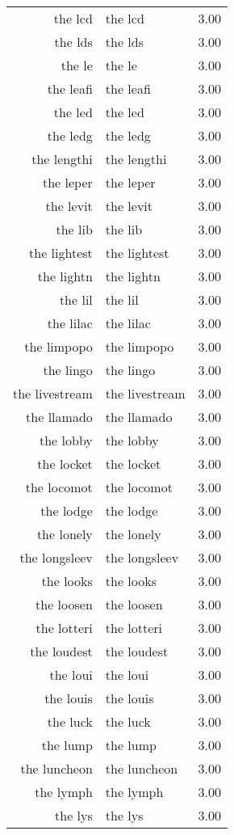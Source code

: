 \begin{table}[ht]
\begin{tabular}{rlr}
  the lcd & the lcd & 3.00 \\ 
  the lds & the lds & 3.00 \\ 
  the le & the le & 3.00 \\ 
  the leafi & the leafi & 3.00 \\ 
  the led & the led & 3.00 \\ 
  the ledg & the ledg & 3.00 \\ 
  the lengthi & the lengthi & 3.00 \\ 
  the leper & the leper & 3.00 \\ 
  the levit & the levit & 3.00 \\ 
  the lib & the lib & 3.00 \\ 
  the lightest & the lightest & 3.00 \\ 
  the lightn & the lightn & 3.00 \\ 
  the lil & the lil & 3.00 \\ 
  the lilac & the lilac & 3.00 \\ 
  the limpopo & the limpopo & 3.00 \\ 
  the lingo & the lingo & 3.00 \\ 
  the livestream & the livestream & 3.00 \\ 
  the llamado & the llamado & 3.00 \\ 
  the lobby & the lobby & 3.00 \\ 
  the locket & the locket & 3.00 \\ 
  the locomot & the locomot & 3.00 \\ 
  the lodge & the lodge & 3.00 \\ 
  the lonely & the lonely & 3.00 \\ 
  the longsleev & the longsleev & 3.00 \\ 
  the looks & the looks & 3.00 \\ 
  the loosen & the loosen & 3.00 \\ 
  the lotteri & the lotteri & 3.00 \\ 
  the loudest & the loudest & 3.00 \\ 
  the loui & the loui & 3.00 \\ 
  the louis & the louis & 3.00 \\ 
  the luck & the luck & 3.00 \\ 
  the lump & the lump & 3.00 \\ 
  the luncheon & the luncheon & 3.00 \\ 
  the lymph & the lymph & 3.00 \\ 
  the lys & the lys & 3.00 \\ 

\end{tabular}
\end{table}

